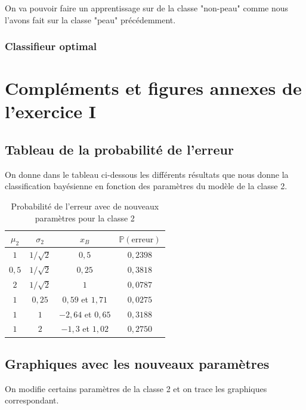 \documentclass[11pt,a4paper]{article}
\begin{document}
On va pouvoir faire un apprentissage sur de la classe "non-peau" comme nous l'avons fait sur la classe "peau" précédemment.


\subsubsection{Classifieur optimal}

\newpage
\appendix
\section{Compléments et figures annexes de l'exercice I}
\subsection{Tableau de la probabilité de l'erreur}

On donne dans le tableau ci-dessous les différents résultats que nous donne la classification bayésienne en fonction des paramètres du modèle de la classe 2.
\begin{table}[H]
\center
\begin{tabular}{|c|c|c|c|}
\hline 
$\mu_2$ & $\sigma_2$ & $x_B$ & $\mathbb{P}(\text{erreur})$ \\ 
\hline 
$1$ & $1/ \sqrt{2}$ & $0,5$ & $0,2398$ \\ 
\hline 
$0,5$ & $1/ \sqrt{2}$ & $0,25$ & $0,3818$ \\ 
\hline 
$2$ & $1/ \sqrt{2}$ & $1$ & $0,0787$ \\ 
\hline 
$1$ & $0,25$ & $0,59$ et $1,71$ & $0,0275$ \\ 
\hline 
$1$ & $1$ & $-2,64$ et $0,65$ & $0,3188$ \\ 
\hline 
$1$ & $2$ & $-1,3$ et $1,02$ & $0,2750$ \\ 
\hline 
\end{tabular}
\caption{Probabilité de l'erreur avec de nouveaux paramètres pour la classe 2}

\end{table}


\subsection{Graphiques avec les nouveaux paramètres}
On modifie certains paramètres de la classe 2 et on trace les graphiques correspondant.
\end{document}
